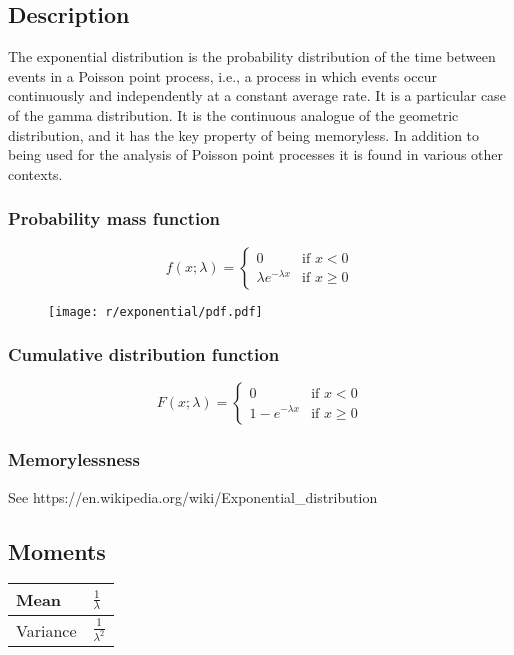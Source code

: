 \subsection{Description}
The exponential distribution is the probability distribution of the time between events in a Poisson point process, i.e., a process in which events occur continuously and independently at a constant average rate. It is a particular case of the gamma distribution. It is the continuous analogue of the geometric distribution, and it has the key property of being memoryless. In addition to being used for the analysis of Poisson point processes it is found in various other contexts.


\subsubsection{Probability mass function}
\[
	f(x; \lambda) =
	\begin{cases}
		0 & \text{if } x < 0 \\
		\lambda e^{-\lambda x} & \text{if } x \geq 0
	\end{cases}
\]

\begin{figure}[H]
	\texttt{[image: r/exponential/pdf.pdf]}
\end{figure}

\subsubsection{Cumulative distribution function}
\[
	F(x; \lambda) =
	\begin{cases}
		0 & \text{if } x < 0 \\
		1 - e^{-\lambda x} & \text{if } x \geq 0
	\end{cases}
\]

\subsubsection{Memorylessness}
See https://en.wikipedia.org/wiki/Exponential\_distribution

\subsection{Moments}

\begin{tabularx}{\textwidth}{s X}
	\hline
	Mean & $\frac{1}{\lambda}$ \\\hline
	Variance & $\frac{1}{\lambda ^2}$\\\hline
\end{tabularx}


